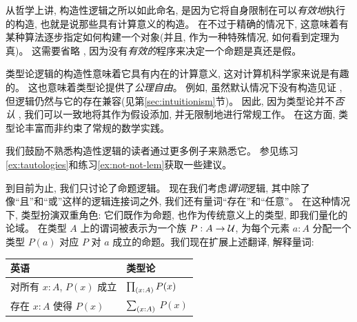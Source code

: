 从哲学上讲, 构造性逻辑之所以如此命名, 是因为它将自身限制在可以\emph{有效地}执行的构造, 也就是说那些具有计算意义的构造。
在不过于精确的情况下, 这意味着有某种算法逐步指定如何构建一个对象(并且, 作为一种特殊情况, 如何看到定理为真)。
这需要省略 \LEM{}, 因为没有\emph{有效的}程序来决定一个命题是真还是假。

类型论逻辑的构造性意味着它具有内在的计算意义, 这对计算机科学家来说是有趣的。
这也意味着类型论提供了\emph{公理自由}。
例如, 虽然默认情况下没有构造见证 \LEM{}, 但逻辑仍然与它的存在兼容(见第\ref{sec:intuitionism}节)。
因此, 因为类型论并不\emph{否认} \LEM{}, 我们可以一致地将其作为假设添加, 并无限制地进行常规工作。
在这方面, 类型论丰富而非约束了常规的数学实践。

我们鼓励不熟悉构造性逻辑的读者通过更多例子来熟悉它。
参见练习\ref{ex:tautologies}和练习\ref{ex:not-not-lem}获取一些建议。

\mentalpause

到目前为止, 我们只讨论了命题逻辑。
%
%
%
%
%
现在我们考虑\emph{谓词}逻辑, 其中除了像``且''和``或''这样的逻辑连接词之外, 我们还有量词``存在''和``任意''。
在这种情况下, 类型扮演双重角色: 它们既作为命题, 也作为传统意义上的类型, 即我们量化的论域。
在类型 $A$ 上的谓词被表示为一个族 $P : A \to \mathcal{U}$, 为每个元素 $a : A$ 分配一个类型 $P(a)$ 对应 $P$ 对 $a$ 成立的命题。我们现在扩展上述翻译, 解释量词:
\begin{center}
  \medskip
  \begin{tabular}{ll}
    \toprule
    英语 & 类型论\\
    \midrule
    对所有 $x:A$, $P(x)$ 成立 & $\prd{x:A} P(x)$ \\
    存在 $x:A$ 使得 $P(x)$ & $\sm{x:A}$ $P(x)$ \\
    \bottomrule
  \end{tabular}
  \medskip
\end{center}

